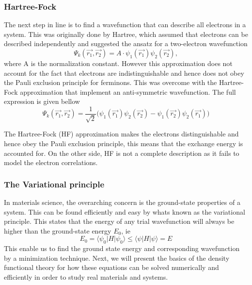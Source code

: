 \subsubsection{Hartree-Fock}
The next step in line is to find a wavefunction that can describe all electrons in a system. This was originally done by Hartree, which assumed that electrons can be described independently and suggested the ansatz for a two-electron wavefunction
\begin{equation}
    \Psi_k(\vec{r_1}, \vec{r_2}) = A \cdot \psi_1(\vec{r_1}) \psi_2(\vec{r_2}),
\end{equation}
where A is the normalization constant. However this approximation does not account for the fact that electrons are indistinguishable and hence does not obey the Pauli exclusion principle for ferminons. This was overcome with the Hartree-Fock approximation that implement an anti-symmetric wavefunction. The full expression is given bellow
\begin{equation}
    \Psi_k(\vec{r_1}, \vec{r_2}) = \frac{1}{\sqrt{2}} \Big( \psi_1(\vec{r_1}) \psi_2(\vec{r_2}) - \psi_1(\vec{r_2})\psi_2(\vec{r_1}) \Big)
\end{equation}

The Hartree-Fock (HF) approximation makes the electrons distinguishable and hence obey the Pauli exclusion principle, this means that the exchange energy is accounted for. On the other side, HF is not a complete description as it fails to model the electron correlations. 

\subsubsection{The Variational principle}
In materials science, the overarching concern is the ground-state properties of a system. This can be found efficiently and easy by whats known as the variational principle. This states that the energy of any trial wavefunction will always be higher than the ground-state energy $E_0$, ie
\begin{equation}
    E_0 = \langle\psi_0|H|\psi_0\rangle \leq \langle\psi|H|\psi\rangle = E
\end{equation}
This enable us to find the ground state energy and corresponding wavefunction by a minimization technique. Next, we will present the basics of the density functional theory for how these equations can be solved numerically and efficiently in order to study real materials and systems.

